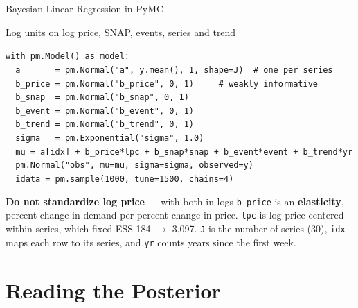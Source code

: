 \documentclass[aspectratio=169, 11pt]{beamer}
\begin{document}
\begin{frame}{Bayesian Linear Regression in PyMC}
  \begin{examplebox}{Log units on log price, SNAP, events, series and trend}
    {\scriptsize\linespread{1.05}\selectfont
    \texttt{with pm.Model() as model:}\\
    \texttt{\mbox{}\ \ a\ \ \ \ \ \ \ = pm.Normal("a", y.mean(), 1, shape=J)\ \ \# one per series}\\
    \texttt{\mbox{}\ \ b\_price = pm.Normal("b\_price", 0, 1)\ \ \ \ \ \# weakly informative}\\
    \texttt{\mbox{}\ \ b\_snap\ \ = pm.Normal("b\_snap",\ 0, 1)}\\
    \texttt{\mbox{}\ \ b\_event = pm.Normal("b\_event", 0, 1)}\\
    \texttt{\mbox{}\ \ b\_trend = pm.Normal("b\_trend", 0, 1)}\\
    \texttt{\mbox{}\ \ sigma\ \ \ = pm.Exponential("sigma", 1.0)}\\
    \texttt{\mbox{}\ \ mu = a[idx] + b\_price*lpc + b\_snap*snap + b\_event*event + b\_trend*yr}\\
    \texttt{\mbox{}\ \ pm.Normal("obs", mu=mu, sigma=sigma, observed=y)}\\
    \texttt{\mbox{}\ \ idata = pm.sample(1000, tune=1500, chains=4)}\par
    }
  \end{examplebox}
  \textbf{Do not standardize log price} --- with both in logs \texttt{b\_price} is an
  \textbf{elasticity}, percent change in demand per percent change in price. \texttt{lpc} is log
  price centered within series, which fixed ESS 184 $\rightarrow$ 3{,}097. \texttt{J} is the
  number of series (30), \texttt{idx} maps each row to its series, and \texttt{yr} counts years
  since the first week.
\end{frame}

\section{Reading the Posterior}

\end{document}
